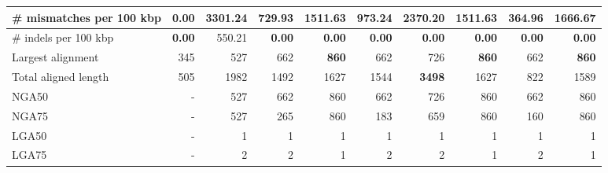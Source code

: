 \documentclass[12pt,a4paper]{article}
\begin{document}
\begin{table}[ht]
\begin{center}
\begin{tabular}{|l*{9}{|r}|}
\# mismatches per 100 kbp & {\bf 0.00} & 3301.24 & 729.93 & 1511.63 & 973.24 & 2370.20 & 1511.63 & 364.96 & 1666.67 \\ \hline
\# indels per 100 kbp & {\bf 0.00} & 550.21 & {\bf 0.00} & {\bf 0.00} & {\bf 0.00} & {\bf 0.00} & {\bf 0.00} & {\bf 0.00} & {\bf 0.00} \\ \hline
Largest alignment & 345 & 527 & 662 & {\bf 860} & 662 & 726 & {\bf 860} & 662 & {\bf 860} \\ \hline
Total aligned length & 505 & 1982 & 1492 & 1627 & 1544 & {\bf 3498} & 1627 & 822 & 1589 \\ \hline
NGA50 & - & 527 & 662 & 860 & 662 & 726 & 860 & 662 & 860 \\ \hline
NGA75 & - & 527 & 265 & 860 & 183 & 659 & 860 & 160 & 860 \\ \hline
LGA50 & - & 1 & 1 & 1 & 1 & 1 & 1 & 1 & 1 \\ \hline
LGA75 & - & 2 & 2 & 1 & 2 & 2 & 1 & 2 & 1 \\ \hline
\end{tabular}
\end{center}
\end{table}
\end{document}

